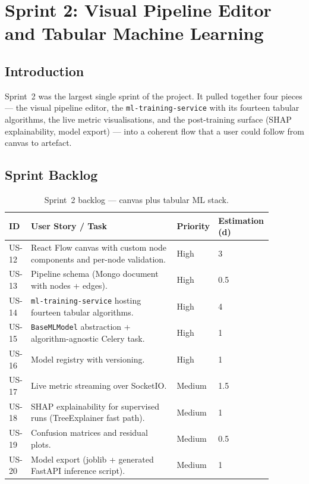 \documentclass[12pt, a4paper, oneside]{report}
\begin{document}
\chapter{Sprint 2: Visual Pipeline Editor and Tabular Machine Learning}

\section*{Introduction}

Sprint~2 was the largest single sprint of the project. It pulled
together four pieces --- the visual pipeline editor, the
\texttt{ml-training-service} with its fourteen tabular algorithms,
the live metric visualisations, and the post-training surface (SHAP
explainability, model export) --- into a coherent flow that a user
could follow from canvas to artefact.

\section{Sprint Backlog}

\begin{table}[H]
\centering
\caption{Sprint~2 backlog --- canvas plus tabular ML stack.}
\label{tab:sprint2_backlog}
\begin{tabular}{|p{0.05\linewidth}|L{0.55\linewidth}|p{0.1\linewidth}|p{0.18\linewidth}|}
\hline
\textbf{ID} & \textbf{User Story / Task} & \textbf{Priority} & \textbf{Estimation (d)} \\
\hline
US-12 & React Flow canvas with custom node components and per-node validation. & High & 3 \\ \hline
US-13 & Pipeline schema (Mongo document with nodes + edges). & High & 0.5 \\ \hline
US-14 & \texttt{ml-training-service} hosting fourteen tabular algorithms. & High & 4 \\ \hline
US-15 & \texttt{BaseMLModel} abstraction + algorithm-agnostic Celery task. & High & 1 \\ \hline
US-16 & Model registry with versioning. & High & 1 \\ \hline
US-17 & Live metric streaming over SocketIO. & Medium & 1.5 \\ \hline
US-18 & SHAP explainability for supervised runs (TreeExplainer fast path). & Medium & 1 \\ \hline
US-19 & Confusion matrices and residual plots. & Medium & 0.5 \\ \hline
US-20 & Model export (joblib + generated FastAPI inference script). & Medium & 1 \\
\hline
\end{tabular}
\end{table}
\end{document}
